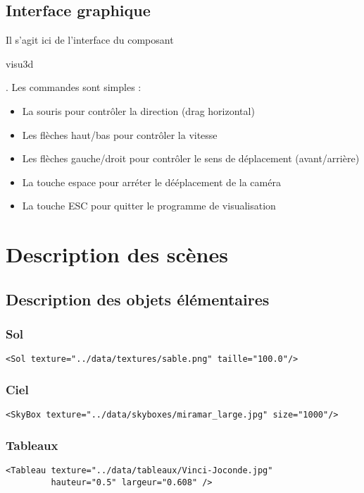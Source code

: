 \documentclass{article}
\begin{document}
\subsection{Interface graphique}
Il s'agit ici de l'interface du composant \begin{tt}visu3d\end{tt}. Les commandes sont simples : 
%
\begin{itemize}
\item La souris pour contrôler la direction (drag horizontal)
\item Les flèches haut/bas pour contrôler la vitesse
\item Les flèches gauche/droit pour contrôler le sens de déplacement (avant/arrière) 
\item La touche espace pour arréter le dééplacement de la caméra
\item La touche ESC pour quitter le programme de visualisation
\end{itemize}


\section{Description des scènes}

\subsection{Description des objets élémentaires}

\subsubsection{Sol}
\begin{verbatim}
<Sol texture="../data/textures/sable.png" taille="100.0"/>
\end{verbatim}

\subsubsection{Ciel}
\begin{verbatim}
<SkyBox texture="../data/skyboxes/miramar_large.jpg" size="1000"/>
\end{verbatim}

\subsubsection{Tableaux}
\begin{verbatim}
<Tableau texture="../data/tableaux/Vinci-Joconde.jpg" 
         hauteur="0.5" largeur="0.608" />
\end{verbatim}
    
\end{document}
